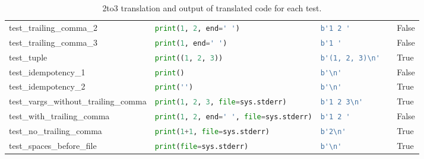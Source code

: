 \begin{table*}[ht]
\begin{tabular}{@{}l|lll@{}}
    test\_trailing\_comma\_2              & \lstinline[language=Python, style=pythonstyle]|print(1, 2, end=' ')                 | & \lstinline[language=Python, style=pythonstyle]|b'1 2 '  |                              & False               \\
    test\_trailing\_comma\_3              & \lstinline[language=Python, style=pythonstyle]|print(1, end=' ')                    | & \lstinline[language=Python, style=pythonstyle]|b'1 '        |                          & False               \\
    test\_tuple                           & \lstinline[language=Python, style=pythonstyle]|print((1, 2, 3))                     | & \lstinline[language=Python, style=pythonstyle]|b'(1, 2, 3)\n'  |        & True                \\
    test\_idempotency\_1                  & \lstinline[language=Python, style=pythonstyle]|print()                              | & \lstinline[language=Python, style=pythonstyle]|b'\n'     |              & False               \\
    test\_idempotency\_2                  & \lstinline[language=Python, style=pythonstyle]|print('')                            | & \lstinline[language=Python, style=pythonstyle]|b'\n'        |           & True                \\
    test\_vargs\_without\_trailing\_comma & \lstinline[language=Python, style=pythonstyle]|print(1, 2, 3, file=sys.stderr)      | & \lstinline[language=Python, style=pythonstyle]|b'1 2 3\n'  |            & True                \\
    test\_with\_trailing\_comma           & \lstinline[language=Python, style=pythonstyle]|print(1, 2, end=' ', file=sys.stderr)| & \lstinline[language=Python, style=pythonstyle]|b'1 2 '    |                            & False               \\
    test\_no\_trailing\_comma             & \lstinline[language=Python, style=pythonstyle]|print(1+1, file=sys.stderr)          | & \lstinline[language=Python, style=pythonstyle]|b'2\n'    |             & True                \\
    test\_spaces\_before\_file            & \lstinline[language=Python, style=pythonstyle]|print(file=sys.stderr)               | & \lstinline[language=Python, style=pythonstyle]|b'\n'   |                & True                \\ \bottomrule
    \end{tabular}
    \caption{2to3 translation and output of translated code for each test.}
    \label{tab:2to3-accuracy}
\end{table*}

